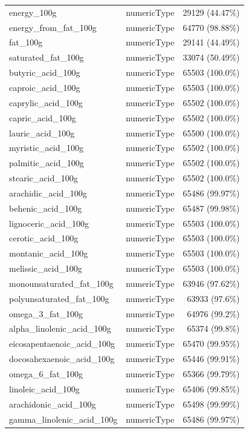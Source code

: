 \documentclass[11pt]{article}
\begin{document}
\begin{center}
\begin{longtable}{|l|c|r|}
energy\_100g& numericType& 29129 (44.47\%)\\
energy\_from\_fat\_100g& numericType& 64770 (98.88\%)\\
fat\_100g& numericType& 29141 (44.49\%)\\
saturated\_fat\_100g& numericType& 33074 (50.49\%)\\
butyric\_acid\_100g& numericType& 65503 (100.0\%)\\
caproic\_acid\_100g& numericType& 65503 (100.0\%)\\
caprylic\_acid\_100g& numericType& 65502 (100.0\%)\\
capric\_acid\_100g& numericType& 65502 (100.0\%)\\
lauric\_acid\_100g& numericType& 65500 (100.0\%)\\
myristic\_acid\_100g& numericType& 65502 (100.0\%)\\
palmitic\_acid\_100g& numericType& 65502 (100.0\%)\\
stearic\_acid\_100g& numericType& 65502 (100.0\%)\\
arachidic\_acid\_100g& numericType& 65486 (99.97\%)\\
behenic\_acid\_100g& numericType& 65487 (99.98\%)\\
lignoceric\_acid\_100g& numericType& 65503 (100.0\%)\\
cerotic\_acid\_100g& numericType& 65503 (100.0\%)\\
montanic\_acid\_100g& numericType& 65503 (100.0\%)\\
melissic\_acid\_100g& numericType& 65503 (100.0\%)\\
monounsaturated\_fat\_100g& numericType& 63946 (97.62\%)\\
polyunsaturated\_fat\_100g& numericType& 63933 (97.6\%)\\
omega\_3\_fat\_100g& numericType& 64976 (99.2\%)\\
alpha\_linolenic\_acid\_100g& numericType& 65374 (99.8\%)\\
eicosapentaenoic\_acid\_100g& numericType& 65470 (99.95\%)\\
docosahexaenoic\_acid\_100g& numericType& 65446 (99.91\%)\\
omega\_6\_fat\_100g& numericType& 65366 (99.79\%)\\
linoleic\_acid\_100g& numericType& 65406 (99.85\%)\\
arachidonic\_acid\_100g& numericType& 65498 (99.99\%)\\
gamma\_linolenic\_acid\_100g& numericType& 65486 (99.97\%)\\

\end{longtable}
\end{center}
\end{document}
